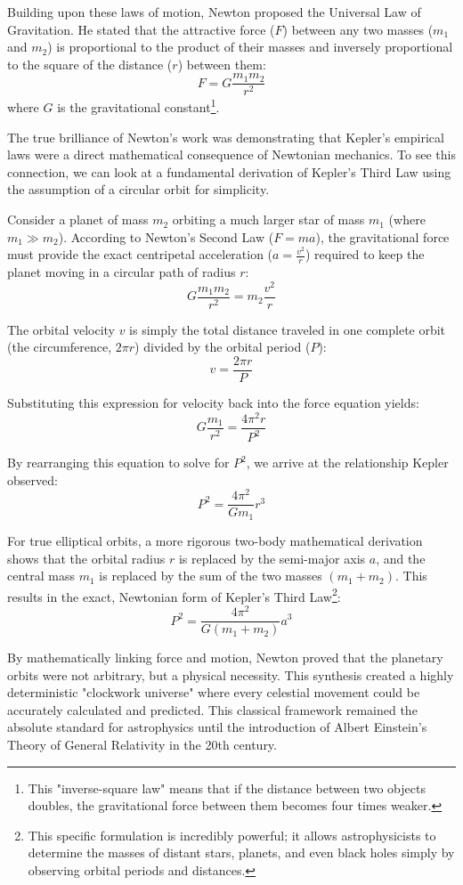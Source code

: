 \documentclass[10pt,a4paper]{article}
\begin{document}
Building upon these laws of motion, Newton proposed the Universal Law of Gravitation. He stated that the attractive force ($F$) between any two masses ($m_1$ and $m_2$) is proportional to the product of their masses and inversely proportional to the square of the distance ($r$) between them:
$$F = G \frac{m_1 m_2}{r^2}$$
where $G$ is the gravitational constant\footnote{This "inverse-square law" means that if the distance between two objects doubles, the gravitational force between them becomes four times weaker.}. 

The true brilliance of Newton's work was demonstrating that Kepler’s empirical laws were a direct mathematical consequence of Newtonian mechanics. To see this connection, we can look at a fundamental derivation of Kepler's Third Law using the assumption of a circular orbit for simplicity.

Consider a planet of mass $m_2$ orbiting a much larger star of mass $m_1$ (where $m_1 \gg m_2$). According to Newton's Second Law ($F = ma$), the gravitational force must provide the exact centripetal acceleration ($a = \frac{v^2}{r}$) required to keep the planet moving in a circular path of radius $r$:
$$G \frac{m_1 m_2}{r^2} = m_2 \frac{v^2}{r}$$

The orbital velocity $v$ is simply the total distance traveled in one complete orbit (the circumference, $2\pi r$) divided by the orbital period ($P$):
$$v = \frac{2\pi r}{P}$$

Substituting this expression for velocity back into the force equation yields:
$$G \frac{m_1}{r^2} = \frac{4\pi^2 r}{P^2}$$

By rearranging this equation to solve for $P^2$, we arrive at the relationship Kepler observed:
$$P^2 = \frac{4\pi^2}{G m_1} r^3$$

For true elliptical orbits, a more rigorous two-body mathematical derivation shows that the orbital radius $r$ is replaced by the semi-major axis $a$, and the central mass $m_1$ is replaced by the sum of the two masses $(m_1 + m_2)$. This results in the exact, Newtonian form of Kepler's Third Law\footnote{This specific formulation is incredibly powerful; it allows astrophysicists to determine the masses of distant stars, planets, and even black holes simply by observing orbital periods and distances.}:
$$P^2 = \frac{4\pi^2}{G(m_1 + m_2)} a^3$$

By mathematically linking force and motion, Newton proved that the planetary orbits were not arbitrary, but a physical necessity. This synthesis created a highly deterministic "clockwork universe" where every celestial movement could be accurately calculated and predicted. This classical framework remained the absolute standard for astrophysics until the introduction of Albert Einstein's Theory of General Relativity in the 20th century.
\end{document}
